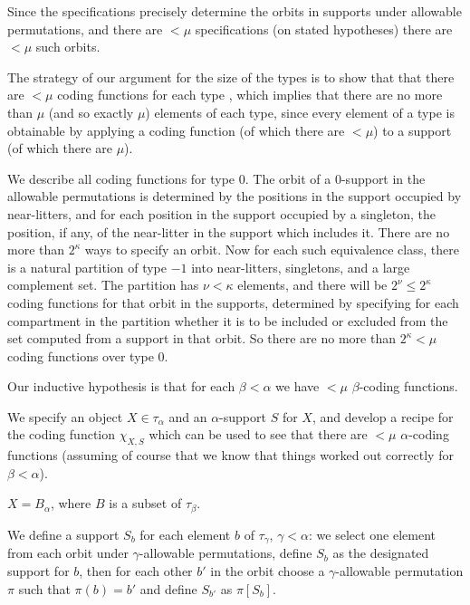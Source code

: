 \documentclass[112pt]{article}
\begin{document}
Since the specifications precisely determine the orbits in supports under allowable permutations, and there are $<\mu$ specifications
(on stated hypotheses) there are $<\mu$ such orbits.

The strategy of our argument for the size of the types is to show that that there are $<\mu$ coding functions for each type , which implies that there are no more than $\mu$ (and so exactly $\mu$) elements of each type, since every element of a type is obtainable by applying a coding function (of which there are $<\mu$) to a support (of which there are $\mu$).

\begin{description}

\item[Analysis of coding functions for type 0:]  We describe all coding functions for type 0.  The orbit of a 0-support in the allowable permutations is determined by the positions in the support  occupied by near-litters, and for each position in the support occupied by a singleton, the position, if any, of the near-litter in the support  which includes it.  There are no more than $2^\kappa$ ways to specify an orbit.  Now for each such equivalence class, there is a natural partition of type $-1$ into near-litters, singletons, and a large complement set.  The partition has $\nu<\kappa$ elements, and there will be $2^\nu\leq 2^\kappa$ coding functions for that orbit in the supports, determined by specifying for each compartment in the partition whether it is to be included or excluded from the set computed from a support in that orbit.  So there are no more than $2^\kappa<\mu$ coding functions over type 0.

\item[Analysis of the general case:]  

\item
Our inductive hypothesis is that for each $\beta<\alpha$ we have $<\mu$ $\beta$-coding functions.



We specify an object $X\in \tau_\alpha$ and an $\alpha$-support $S$ for $X$, and develop a recipe for the coding function $\chi_{X,S}$ which can be used to see that there are $<\mu$ $\alpha$-coding functions (assuming of course that we know that things worked out correctly for $\beta<\alpha$).

$X = B_\alpha$, where $B$ is a subset of $\tau_\beta$.  

We define a support $S_b$ for each element $b$ of $\tau_\gamma$, $\gamma<\alpha$:  we select one element from each orbit  under $\gamma$-allowable permutations, define $S_b$ as the designated support for $b$, then for each other $b'$ in the orbit choose
a $\gamma$-allowable permutation $\pi$ such that $\pi(b)=b'$ and define $S_{b'}$ as $\pi[S_b]$.


\end{description}
\end{document}
